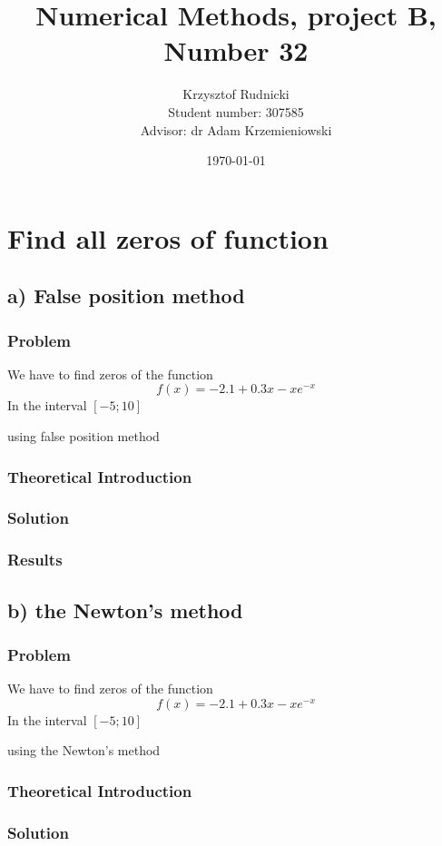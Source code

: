 \documentclass[12pt]{report}
\title{Numerical Methods, project B, Number 32}
\author{Krzysztof Rudnicki\\ Student number: 307585 \\ Advisor: dr Adam Krzemieniowski}
\date{\today}
\begin{document}
\maketitle
\tableofcontents

\chapter{Find all zeros of function}

\section{a) False position method}

\subsection{Problem}

We have to find zeros of the function
\[ f(x) = -2.1 + 0.3x - xe^{-x} \]
In the interval $[-5; 10]$

using false position method

\subsection{Theoretical Introduction}
\subsection{Solution}
\subsection{Results}

\section{b) the Newton's method}

\subsection{Problem}

We have to find zeros of the function
\[ f(x) = -2.1 + 0.3x - xe^{-x} \]
In the interval $[-5; 10]$

using the Newton's method
\subsection{Theoretical Introduction}
\subsection{Solution}
\end{document}
